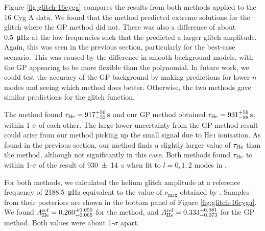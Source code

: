 Figure \ref{fig:glitch-16cyga} compares the results from both methods applied to the 16 Cyg A data. We found that the  method predicted extreme solutions for the glitch where the GP method did not. There was also a difference of about \SI{0.5}{\micro\hertz} at the low frequencies such that the  predicted a larger glitch amplitude. Again, this was seen in the previous section, particularly for the best-case scenario. This was caused by the difference in smooth background models, with the GP appearing to be more flexible than the polynomial. In future work, we could test the accuracy of the GP background by making predictions for lower \(n\) modes and seeing which method does better. Otherwise, the two methods gave similar predictions for the glitch function. 


The  method found \(\tau_{{\mathrm{He}}} = 917_{-53}^{+50} \, \mathrm{s}\) and our GP method obtained \(\tau_{{\mathrm{He}}} = 931_{-88}^{+59} \, \mathrm{s}\), within 1-\(\sigma\) of each other. The large lower uncertainty from the GP method result could arise from our method picking up the small signal due to He\,\textsc{i} ionisation. As found in the previous section, our method finds a slightly larger value of \(\tau_{{\mathrm{He}}}\) than the  method, although not significantly in this case. Both methods found \(\tau_{{\mathrm{He}}}\) to within 1-\(\sigma\) of the result of \SI{930(14)}{\second} when fit to \(l=0,1,2\) modes in \citet{Verma.Faria.ea2014}.

For both methods, we calculated the helium glitch amplitude at a reference frequency of \SI{2188.5}{\micro\hertz} equivalent to the value of \(\nu_{\max}\) obtained by \citet{Lund.SilvaAguirre.ea2017}. Samples from their posteriors are shown in the bottom panel of Figure \ref{fig:glitch-16cyga}. We found \(A_{{\mathrm{He}}}^\mathrm{ref} = 0.260_{-0.065}^{+0.050}\) for the  method, and \(A_{{\mathrm{He}}}^\mathrm{ref} = 0.333_{-0.073}^{+0.081}\) for the GP method. Both values were about 1-\(\sigma\) apart.


